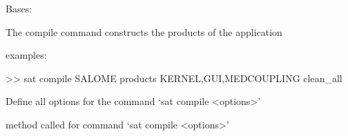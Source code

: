 \documentclass[a4paper,10pt,english]{sphinxmanual}
\begin{document}
\begin{fulllineitems}
\label{\detokenize{apidoc_commands/commands:commands.compile.Command}}
Bases: 

The compile command constructs the products of the application

\begin{DUlineblock}{0em}
\item[] examples:
\item[] \textgreater{}\textgreater{} sat compile SALOME \textendash{}products KERNEL,GUI,MEDCOUPLING \textendash{}clean\_all
\end{DUlineblock}

\begin{fulllineitems}
\label{\detokenize{apidoc_commands/commands:commands.compile.Command.getParser}}
Define all options for the command ‘sat compile \textless{}options\textgreater{}’

\end{fulllineitems}


\begin{fulllineitems}
\label{\detokenize{apidoc_commands/commands:commands.compile.Command.name}}
\end{fulllineitems}


\begin{fulllineitems}
\label{\detokenize{apidoc_commands/commands:commands.compile.Command.run}}
method called for command ‘sat compile \textless{}options\textgreater{}’

\end{fulllineitems}


\end{fulllineitems}

\end{document}
